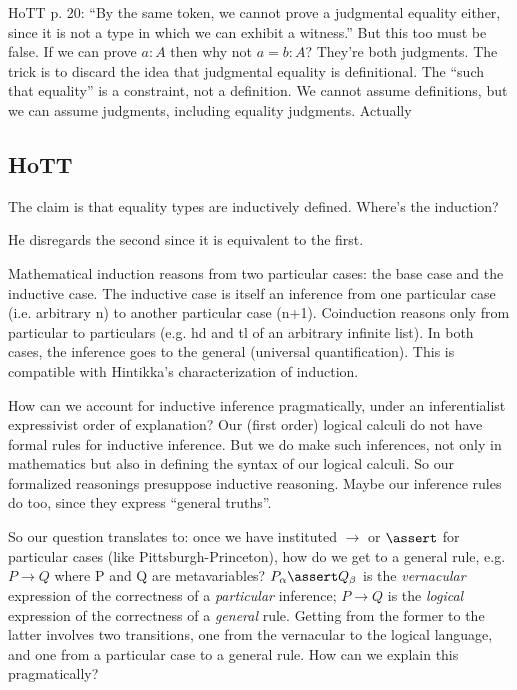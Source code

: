 \documentclass{article}
\begin{document}
HoTT p. 20: ``By the same token, we cannot prove a judgmental equality
either, since it is not a type in which we can exhibit a witness.''
But this too must be false. If we can prove \(a:A\) then why not
\(a=b:A\)? They're both judgments. The trick is to discard the idea
that judgmental equality is definitional. The ``such that equality''
is a constraint, not a definition. We cannot assume definitions, but
we can assume judgments, including equality judgments. Actually


\subsection{HoTT}

The claim is that equality types are inductively defined. Where's the
induction?


He disregards the second since it is equivalent to the first.

Mathematical induction reasons from two particular cases: the base
case and the inductive case. The inductive case is itself an inference
from one particular case (i.e. arbitrary n) to another particular case
(n+1). Coinduction reasons only from particular to particulars (e.g.
hd and tl of an arbitrary infinite list). In both cases, the inference
goes to the general (universal quantification). This is compatible
with Hintikka's characterization of induction.

How can we account for inductive inference pragmatically, under an
inferentialist expressivist order of explanation? Our (first order)
logical calculi do not have formal rules for inductive inference. But
we do make such inferences, not only in mathematics but also in
defining the syntax of our logical calculi. So our formalized
reasonings presuppose inductive reasoning. Maybe our inference rules
do too, since they express ``general truths''.

So our question translates to: once we have instituted \(\rightarrow\)
or \(\linfer\) for particular cases (like Pittsburgh-Princeton), how do
we get to a general rule, e.g. \(P\rightarrow Q\) where P and Q are
metavariables? \(P_{\alpha}\linfer Q_{\beta}\) is the
\textit{vernacular} expression of the correctness of a
\textit{particular} inference; \(P\rightarrow Q\) is the
\textit{logical} expression of the correctness of a \textit{general}
rule. Getting from the former to the latter involves two transitions,
one from the vernacular to the logical language, and one from a
particular case to a general rule. How can we explain this
pragmatically?
\end{document}
